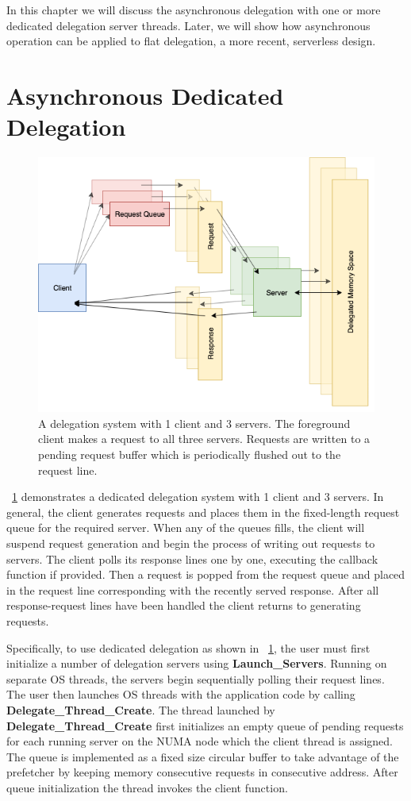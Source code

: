 \documentclass{uicthesi}
\begin{document}
In this chapter we will discuss the asynchronous delegation with one or more dedicated delegation server threads. Later, we will show how asynchronous operation can be applied to flat delegation, a more recent, serverless design. 

\section{Asynchronous Dedicated Delegation}
\begin{figure}[ht!]
\centering
\includegraphics[width=0.9\columnwidth]{FIG/dedicated_async.png}
\caption{A delegation system with 1 client and 3 servers. The foreground client makes a request to all three servers. Requests are written to a pending request buffer which is periodically flushed out to the request line. }
\label{fig:dedicated_delegation}
\end{figure}

~\ref{fig:dedicated_delegation} demonstrates a dedicated delegation system with 1 client and 3 servers. In general, the client generates requests and places them in the fixed-length request queue for the required server. When any of the queues fills, the client will suspend request generation and begin the process of writing out requests to servers. The client polls its response lines one by one, executing the callback function if provided. Then a request is popped from the request queue and placed in the request line corresponding with the recently served response. After all response-request lines have been handled the client returns to generating requests. 

Specifically, to use dedicated delegation as shown in ~\ref{fig:dedicated_delegation}, the user must first initialize a number of delegation servers using \textbf{Launch\_Servers}. Running on separate OS threads, the servers begin sequentially polling their request lines. The user then launches OS threads with the application code by calling \textbf{Delegate\_Thread\_Create}. The thread launched by \textbf{Delegate\_Thread\_Create} first initializes an empty queue of pending requests for each running server on the NUMA node which the client thread is assigned. The queue is implemented as a fixed size circular buffer to take advantage of the prefetcher by keeping memory consecutive requests in consecutive address.  After queue initialization the thread invokes the client function. 
\end{document}
